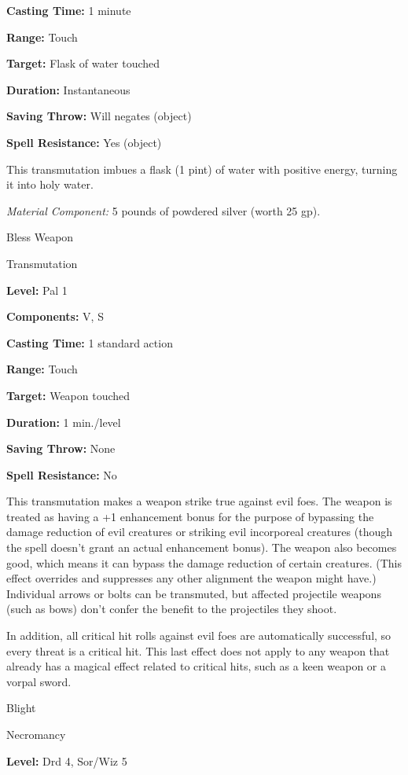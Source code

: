 \documentclass{article}
\begin{document}
\textbf{Casting Time:} 1 minute

\textbf{Range:} Touch

\textbf{Target:} Flask of water touched

\textbf{Duration:} Instantaneous

\textbf{Saving Throw: }Will negates (object)

\textbf{Spell Resistance:} Yes (object)

This transmutation imbues a flask (1 pint) of water with positive energy, turning 
it into holy water.

\textit{Material Component: }5 pounds of powdered silver (worth 25 gp).

\vspace{12pt}
Bless Weapon

Transmutation

\textbf{Level:} Pal 1

\textbf{Components:} V, S

\textbf{Casting Time:} 1 standard action

\textbf{Range:} Touch

\textbf{Target: }Weapon touched

\textbf{Duration:} 1 min./level

\textbf{Saving Throw:} None

\textbf{Spell Resistance:} No

This transmutation makes a weapon strike true against evil foes. The weapon is 
treated as having a +1 enhancement bonus for the purpose of bypassing the damage 
reduction of evil creatures or striking evil incorporeal creatures (though the 
spell doesn't grant an actual enhancement bonus). The weapon also becomes good, 
which means it can bypass the damage reduction of certain creatures. (This effect 
overrides and suppresses any other alignment the weapon might have.) Individual 
arrows or bolts can be transmuted, but affected projectile weapons (such as bows) 
don't confer the benefit to the projectiles they shoot.

In addition, all critical hit rolls against evil foes are automatically successful, 
so every threat is a critical hit. This last effect does not apply to any weapon 
that already has a magical effect related to critical hits, such as a keen weapon 
or a vorpal sword.

\vspace{12pt}
Blight

Necromancy

\textbf{Level:} Drd 4, Sor/Wiz 5
\end{document}
